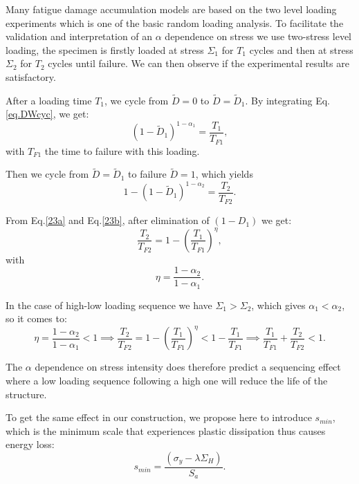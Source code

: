 \documentclass[3p,times,number,review]{elsarticle}
\begin{document}
Many fatigue damage accumulation models are based on the two level loading experiments which is one of the basic random loading analysis. To facilitate the validation and interpretation of an $\alpha$ dependence on stress we use two-stress level loading, the specimen is firstly loaded at stress $\Sigma_1$ for $T_1$ cycles and then at stress $\Sigma_2$ for $T_2$ cycles until failure. We can then observe if the experimental results are satisfactory.

After a loading time $T_1$, we  cycle  from $\tilde{D}=0$ to $\tilde{D}= \tilde{D}_1$. By integrating Eq.\eqref{eq.DWcyc}, we get:
\begin{equation}
\left( 1-\tilde{D}_1\right) ^{1-\alpha_1}=\dfrac{T_1}{T_{F1}},
\label{23a}
\end{equation}
with $T_{F1}$ the time to failure with this loading.

Then we cycle from  ${\tilde D}={\tilde D}_1$ to failure ${\tilde D}=1$, which yields
\begin{equation}
1-\left( 1-\tilde{D}_1\right)^{1-\alpha_2}=\dfrac{T_2}{T_{F2}}.
\label{23b}
\end{equation}

From Eq.\eqref{23a} and Eq.\eqref{23b}, after elimination of $\left( 1-D_1\right)$ we get:
\begin{equation} 
\dfrac{T_2}{T_{F2}} =1-\left( \dfrac{T_1}{T_{F1}}\right) ^\eta,
\end{equation}
with
\begin{equation}
\eta=\dfrac{1-\alpha_2}{1-\alpha_1}.
\label{eq.eta}
\end{equation}

In the case of high-low loading sequence we have $\Sigma_1>\Sigma_2$,  which gives $\alpha_1<\alpha_2$, so it comes to:
$$\eta=\frac{1-\alpha_2}{1-\alpha_1}<1 \implies
\frac{T_2}{T_{F2}}=1-\left( \frac{T_1}{T_{F1}}\right) ^\eta<1-\frac{T_1}{T_{F1}} \implies
\frac{T_1}{T_{F1}}+\frac{T_2}{T_{F2}}<1.$$

The $\alpha$ dependence on stress intensity does therefore predict a sequencing effect where a low loading sequence following a high one will reduce the life of the structure.

To get the same effect in our construction, we propose here to introduce $s_{min}$, which is the minimum scale that experiences plastic dissipation thus causes energy loss:
\begin{equation}
s_{min}=\dfrac{\left(\sigma_y-\lambda \Sigma_H\right)}{S_{a}}.
\label{eq.smin}
\end{equation}
\end{document}
